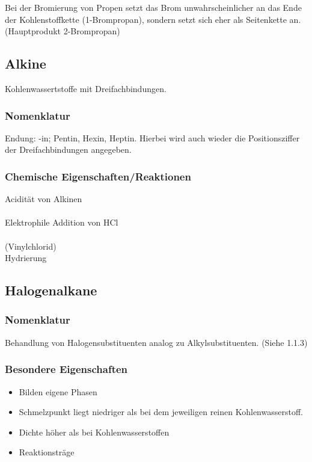 \documentclass[a4paper, fleqn]{article}
\begin{document}
Bei der Bromierung von Propen setzt das Brom unwahrscheinlicher an das Ende der Kohlenstoffkette (1-Brompropan), sondern setzt sich eher als Seitenkette an. (Hauptprodukt 2-Brompropan)\\

\subsection{Alkine}
Kohlenwassertstoffe mit Dreifachbindungen.

\subsubsection{Nomenklatur}
Endung: -in; Pentin, Hexin, Heptin. Hierbei wird auch wieder die Positionsziffer der Dreifachbindungen angegeben.

\subsubsection{Chemische Eigenschaften/Reaktionen}
Acidit\"at von Alkinen\\
\\
Elektrophile Addition von HCl\\\\
 (Vinylchlorid)\\
Hydrierung\\

\subsection{Halogenalkane}
\subsubsection{Nomenklatur}
Behandlung von Halogensubstituenten analog zu Alkylsubstituenten. (Siehe 1.1.3)\\
\subsubsection{Besondere Eigenschaften}
\begin{itemize}
  \item Bilden eigene Phasen
  \item Schmelzpunkt liegt niedriger als bei dem jeweiligen reinen Kohlenwasserstoff.
  \item Dichte h\"oher als bei Kohlenwasserstoffen
  \item Reaktionstr\"age
\end{itemize}
\end{document}
